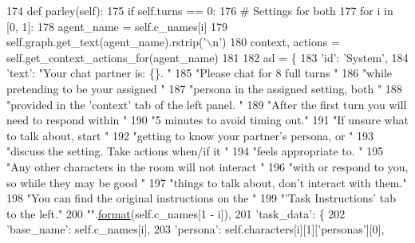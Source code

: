 \begin{DoxyCode}
174     \textcolor{keyword}{def }parley(self):
175         \textcolor{keywordflow}{if} self.turns == 0:
176             \textcolor{comment}{# Settings for both}
177             \textcolor{keywordflow}{for} i \textcolor{keywordflow}{in} [0, 1]:
178                 agent\_name = self.c\_names[i]
179                 self.graph.get\_text(agent\_name).rstrip(\textcolor{stringliteral}{'\(\backslash\)n'})
180                 context, actions = self.get\_context\_actions\_for(agent\_name)
181 
182                 ad = \{
183                     \textcolor{stringliteral}{'id'}: \textcolor{stringliteral}{'System'},
184                     \textcolor{stringliteral}{'text'}: \textcolor{stringliteral}{"Your chat partner is: \{\}. "}
185                     \textcolor{stringliteral}{"Please chat for 8 full turns "}
186                     \textcolor{stringliteral}{"while pretending to be your assigned "}
187                     \textcolor{stringliteral}{"persona in the assigned setting, both "}
188                     \textcolor{stringliteral}{"provided in the 'context' tab of the left panel. "}
189                     \textcolor{stringliteral}{"After the first turn you will need to respond within "}
190                     \textcolor{stringliteral}{"5 minutes to avoid timing out."}
191                     \textcolor{stringliteral}{"If unsure what to talk about, start "}
192                     \textcolor{stringliteral}{"getting to know your partner's persona, or "}
193                     \textcolor{stringliteral}{"discuss the setting. Take actions when/if it "}
194                     \textcolor{stringliteral}{"feels appropriate to. "}
195                     \textcolor{stringliteral}{"Any other characters in the room will not interact "}
196                     \textcolor{stringliteral}{"with or respond to you, so while they may be good "}
197                     \textcolor{stringliteral}{"things to talk about, don't interact with them."}
198                     \textcolor{stringliteral}{"You can find the original instructions on the "}
199                     \textcolor{stringliteral}{"'Task Instructions' tab to the left."}
200                     \textcolor{stringliteral}{""}.\hyperlink{namespaceparlai_1_1chat__service_1_1services_1_1messenger_1_1shared__utils_a32e2e2022b824fbaf80c747160b52a76}{format}(self.c\_names[1 - i]),
201                     \textcolor{stringliteral}{'task\_data'}: \{
202                         \textcolor{stringliteral}{'base\_name'}: self.c\_names[i],
203                         \textcolor{stringliteral}{'persona'}: self.characters[i][1][\textcolor{stringliteral}{'personas'}][0],

\end{DoxyCode}
